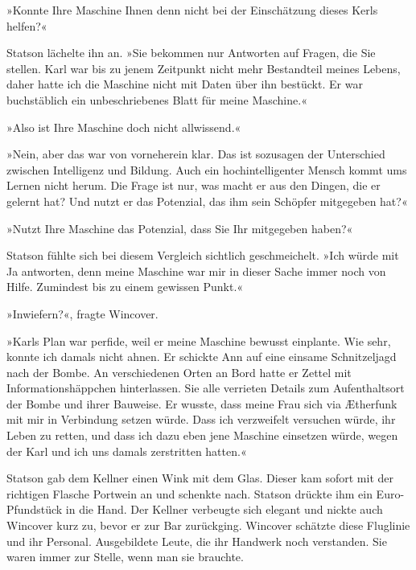 »Konnte Ihre Maschine Ihnen denn nicht bei der Einschätzung dieses
Kerls helfen?«

Statson lächelte ihn an. »Sie bekommen nur Antworten auf Fragen,
die Sie stellen. Karl war bis zu jenem Zeitpunkt nicht mehr
Bestandteil meines Lebens, daher hatte ich die Maschine nicht mit
Daten über ihn bestückt. Er war buchstäblich ein unbeschriebenes
Blatt für meine Maschine.«

»Also ist Ihre Maschine doch nicht allwissend.«

»Nein, aber das war von vorneherein klar. Das ist sozusagen der
Unterschied zwischen Intelligenz und Bildung. Auch ein
hochintelligenter Mensch kommt ums Lernen nicht herum. Die Frage
ist nur, was macht er aus den Dingen, die er gelernt hat? Und nutzt
er das Potenzial, das ihm sein Schöpfer mitgegeben hat?«

»Nutzt Ihre Maschine das Potenzial, dass Sie Ihr mitgegeben
haben?«

Statson fühlte sich bei diesem Vergleich sichtlich geschmeichelt.
»Ich würde mit Ja antworten, denn meine Maschine war mir in dieser
Sache immer noch von Hilfe. Zumindest bis zu einem gewissen
Punkt.«

»Inwiefern?«, fragte Wincover.

»Karls Plan war perfide, weil er meine Maschine bewusst einplante.
Wie sehr, konnte ich damals nicht ahnen. Er schickte Ann auf eine
einsame Schnitzeljagd nach der Bombe. An verschiedenen Orten an
Bord hatte er Zettel mit Informationshäppchen hinterlassen. Sie
alle verrieten Details zum Aufenthaltsort der Bombe und ihrer
Bauweise. Er wusste, dass meine Frau sich via Ætherfunk mit mir in
Verbindung setzen würde. Dass ich verzweifelt versuchen würde, ihr
Leben zu retten, und dass ich dazu eben jene Maschine einsetzen
würde, wegen der Karl und ich uns damals zerstritten hatten.«

Statson gab dem Kellner einen Wink mit dem Glas. Dieser kam sofort
mit der richtigen Flasche Portwein an und schenkte nach. Statson
drückte ihm ein Euro-Pfundstück in die Hand. Der Kellner verbeugte
sich elegant und nickte auch Wincover kurz zu, bevor er zur Bar
zurückging. Wincover schätzte diese Fluglinie und ihr Personal.
Ausgebildete Leute, die ihr Handwerk noch verstanden. Sie waren
immer zur Stelle, wenn man sie brauchte.

